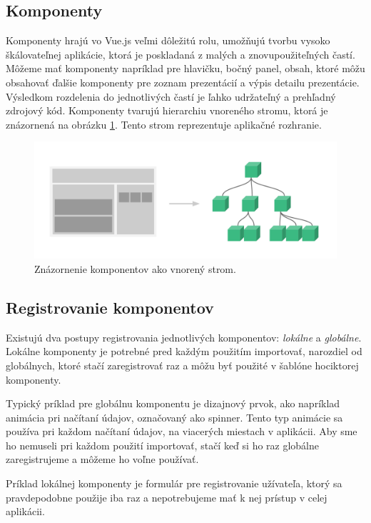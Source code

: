 \subsection*{Komponenty}
Komponenty hrajú vo Vue.js veľmi dôležitú rolu, umožňujú tvorbu vysoko škálovateľnej aplikácie, ktorá je poskladaná z malých a znovupoužiteľných častí. Môžeme mať komponenty napríklad pre hlavičku, bočný panel, obsah, ktoré môžu obsahovať ďalšie komponenty pre zoznam prezentácií a výpis detailu prezentácie. Výsledkom rozdelenia do jednotlivých častí je ľahko udržateľný a prehľadný zdrojový kód. Komponenty tvarujú hierarchiu vnoreného stromu, ktorá je znázornená na obrázku \ref{pic:components}. Tento strom reprezentuje aplikačné rozhranie.
    \begin{figure}[!hbt]
        \centering
        \includegraphics[scale=0.25]{obrazky/components.png}
        \caption{Znázornenie komponentov ako vnorený strom\cite{vue-guide}.}
        \label{pic:components}
    \end{figure}
    
\subsection*{Registrovanie komponentov}
Existujú dva postupy registrovania jednotlivých komponentov: \textit{lokálne} a \textit{globálne}. Lokálne komponenty je potrebné pred každým použitím importovať, narozdiel od globálnych, ktoré stačí zaregistrovať raz a môžu byť použité v šablóne hociktorej komponenty. 

Typický príklad pre globálnu komponentu je dizajnový prvok, ako napríklad animácia pri načítaní údajov, označovaný ako spinner. Tento typ animácie sa používa pri každom načítaní údajov, na viacerých miestach v aplikácii. Aby sme ho nemuseli pri každom použití importovať, stačí keď si ho raz globálne zaregistrujeme a môžeme ho voľne používať. 

Príklad lokálnej komponenty je formulár pre registrovanie užívateľa, ktorý sa pravdepodobne použije iba raz a nepotrebujeme mať k nej prístup v celej aplikácii.

